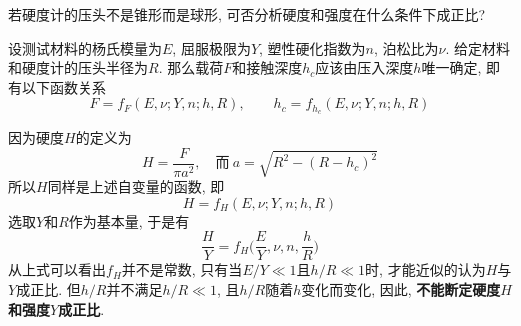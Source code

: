 \begin{problem}[26]
若硬度计的压头不是锥形而是球形, 可否分析硬度和强度在什么条件下成正比?
\end{problem}
\begin{solution}
\begin{minipage}[c]{0.7\linewidth}
设测试材料的杨氏模量为$E$, 屈服极限为$Y$, 塑性硬化指数为$n$, 泊松比为$\nu$. 给定材料和硬度计的压头半径为$R$. 那么载荷$F$和接触深度$h_c$应该由压入深度$h$唯一确定, 即有以下函数关系
\[
F = f_{F} (E, \nu; Y, n; h, R)
,\qquad
h_c = f_{h_c} (E, \nu; Y, n; h, R)
\]
\end{minipage}
\begin{minipage}[c]{0.3\linewidth}
\begin{center}

\end{center}
\end{minipage}
因为硬度$H$的定义为
\[
H = \frac{F}{\pi a^2}
, \quad\text{而}~
a = \sqrt{R^2 - (R-h_c)^2}
\]
所以$H$同样是上述自变量的函数, 即
\[
H = f_H(E, \nu; Y, n; h, R)
\]
选取$Y$和$R$作为基本量, 于是有
\[
\frac{H}{Y} = f_H\bigg(\frac{E}{Y},\nu, n, \frac{h}{R}\bigg)
\]
从上式可以看出$f_H$并不是常数, 只有当$E/Y\ll 1$且$h/R\ll 1$时, 才能近似的认为$H$与$Y$成正比. 但$h/R$并不满足$h/R\ll 1$, 且$h/R$随着$h$变化而变化, 因此, \textbf{不能断定硬度$H$和强度$Y$成正比}.
\end{solution}
